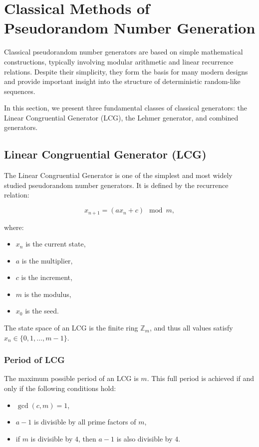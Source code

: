 \section{Classical Methods of Pseudorandom Number Generation}

Classical pseudorandom number generators are based on simple mathematical constructions, typically involving modular arithmetic and linear recurrence relations. Despite their simplicity, they form the basis for many modern designs and provide important insight into the structure of deterministic random-like sequences.

In this section, we present three fundamental classes of classical generators: the Linear Congruential Generator (LCG), the Lehmer generator, and combined generators.

\subsection{Linear Congruential Generator (LCG)}

The Linear Congruential Generator is one of the simplest and most widely studied pseudorandom number generators. It is defined by the recurrence relation:

$$
x_{n+1} = (a x_n + c) \mod m,
$$

where:
\begin{itemize}
    \item $x_n$ is the current state,
    \item $a$ is the multiplier,
    \item $c$ is the increment,
    \item $m$ is the modulus,
    \item $x_0$ is the seed.
\end{itemize}

The state space of an LCG is the finite ring $\mathbb{Z}_m$, and thus all values satisfy $x_n \in \{0,1,\dots,m-1\}$.

\subsubsection{Period of LCG}

The maximum possible period of an LCG is $m$. This full period is achieved if and only if the following conditions hold:

\begin{itemize}
    \item $\gcd(c, m) = 1$,
    \item $a - 1$ is divisible by all prime factors of $m$,
    \item if $m$ is divisible by $4$, then $a - 1$ is also divisible by $4$.
\end{itemize}

